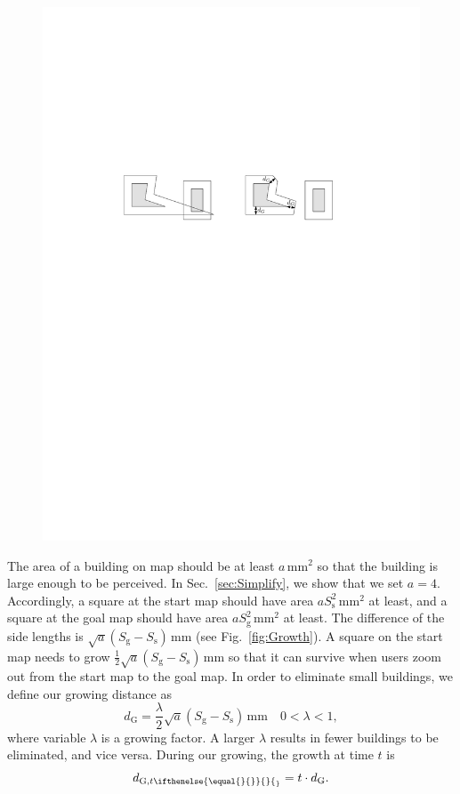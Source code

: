 \documentclass[graybox]{svmult}
\newcommand{\fig}{Fig.~}
\newcommand{\sect}{Sec.~}
\newcommand{\dtrm}[2][]{d_{\mathrm{#2}, t\ifthenelse{\equal{#1}{}}{}{_#1}}}
\begin{document}
\begin{figure}[tb]
	\centering
	\includegraphics{Buffer_MiterLimits}
	\caption{}
	\label{fig:Buffer_MiterLimits}
\end{figure}


The area of a building on map should be at least $a\,\mathrm{mm}^2$ so that the 
building is large enough to be perceived.
In \sect\ref{sec:Simplify}, we show that we set $a=4$.
Accordingly, a square at the start map should have 
area $a S_\mathrm{s}^2\,\mathrm{mm}^2$ at least, and
a square at the goal map should have 
area $a S_\mathrm{g}^2\,\mathrm{mm}^2$ at least.
The difference of the side lengths is 
$\sqrt{a} (S_\mathrm{g}-S_\mathrm{s})\,\mathrm{mm}$ 
 (see \fig\ref{fig:Growth}).
A square on the start map needs to grow $\frac{1}{2}\sqrt{a} 
(S_\mathrm{g}-S_\mathrm{s})\,\mathrm{mm}$ so that 
it can survive when users zoom out from 
the start map to the goal map.
In order to eliminate small buildings, 
we define our growing distance as
\begin{equation}
\label{eq:d_G}
d_\mathrm{G}=\frac{\lambda}{2}\sqrt{a} (S_\mathrm{g}-S_\mathrm{s})\,\mathrm{mm} 
\quad 0 < \lambda <1,
\end{equation}
where variable $\lambda$ is a growing factor. 
A larger $\lambda$ results in  
fewer buildings to be eliminated, and vice versa.
During our growing, the growth at time $t$ is
\begin{equation}
\label{eq:d_Gt}
\dtrm{G} = t \cdot d_\mathrm{G}.
\end{equation}
\end{document}
